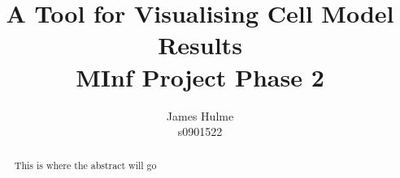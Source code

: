 \documentclass[11pt,a4paper]{article}
\begin{document}
\title{A Tool for Visualising Cell Model Results \\
       MInf Project Phase 2}
\author{James Hulme \\
        s0901522}

\maketitle

\thispagestyle{empty}

\newpage

\begin{abstract}
This is where the abstract will go
\end{abstract}
\thispagestyle{empty}

\newpage

\tableofcontents
\thispagestyle{empty}

\clearpage
\setcounter{page}{1}




%


\clearpage
%


%
%
\end{document}
